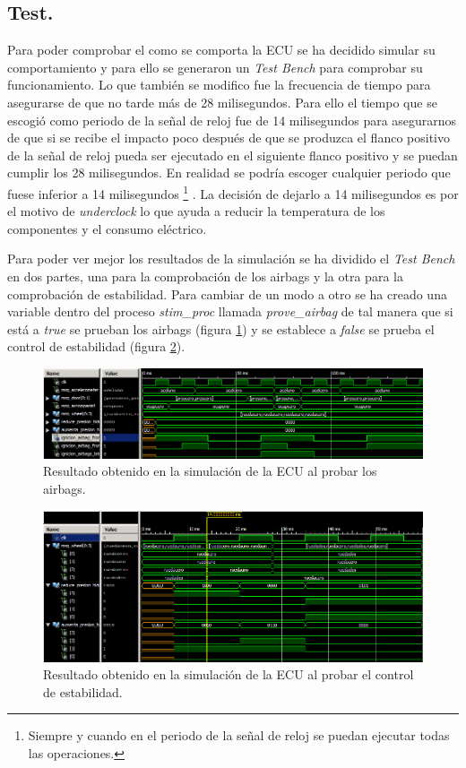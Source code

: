 \documentclass{article}
\begin{document}
\subsection{Test.}

Para poder comprobar el como se comporta la ECU se ha decidido simular su comportamiento y para ello se generaron un \emph{Test Bench} para comprobar su funcionamiento. Lo que también se modifico fue la frecuencia de tiempo para asegurarse de que no tarde más de 28 milisegundos. Para ello el tiempo que se escogió como periodo de la señal de reloj fue de 14 milisegundos para asegurarnos de que si se recibe el impacto poco después de que se produzca el flanco positivo de la señal de reloj pueda ser ejecutado en el siguiente flanco positivo y se puedan cumplir los 28 milisegundos. En realidad se podría escoger cualquier periodo que fuese inferior a 14 milisegundos
\footnote{Siempre y cuando en el periodo de la señal de reloj se puedan ejecutar todas las operaciones.}
. La decisión de dejarlo a 14 milisegundos es por el motivo de \emph{underclock} lo que ayuda a reducir la temperatura de los componentes y el consumo eléctrico.

Para poder ver mejor los resultados de la simulación se ha dividido el \emph{Test Bench} en dos partes, una para la comprobación de los airbags y la otra para la comprobación de estabilidad. Para cambiar de un modo a otro se ha creado una variable dentro del proceso \emph{stim\_proc} llamada \emph{prove\_airbag} de tal manera que si está a \emph{true} se prueban los airbags (figura \ref{fig:p4:tb_airbag}) y se establece a \emph{false} se prueba el control de estabilidad (figura  \ref{fig:p4:tb_wheel}).

\begin{figure}[h]
  \centering
    \includegraphics[width=1\textwidth]{img/p4_tb_airbag.png}
  \caption{Resultado obtenido en la simulación de la ECU al probar los airbags.}
  \label{fig:p4:tb_airbag}
\end{figure}

\begin{figure}[h]
  \centering
    \includegraphics[width=1\textwidth]{img/p4_tb_wheel.png}
  \caption{Resultado obtenido en la simulación de la ECU al probar el control de estabilidad.}
  \label{fig:p4:tb_wheel}
\end{figure}
\end{document}
